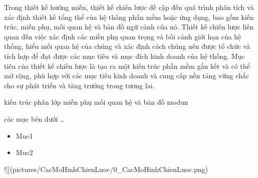 
Trong thiết kế hướng miền, thiết kế chiến lược đề cập đến quá trình phân tích và xác định thiết kế tổng thể của hệ thống phần mềm hoặc ứng dụng, bao gồm kiến trúc, miền phụ, mối quan hệ và bản đồ ngữ cảnh của nó. Thiết kế chiến lược liên quan đến việc xác định các miền phụ quan trọng và bối cảnh giới hạn của hệ thống, hiểu mối quan hệ của chúng và xác định cách chúng nên được tổ chức và tích hợp để đạt được các mục tiêu và mục đích kinh doanh của hệ thống. Mục tiêu của thiết kế chiến lược là tạo ra một kiến trúc phần mềm gắn kết và có thể mở rộng, phù hợp với các mục tiêu kinh doanh và cung cấp nền tảng vững chắc cho sự phát triển và tăng trưởng trong tương lai.

%
kiến trúc phân lớp
miền phụ
mối quan hệ và bản đồ
modun

các mục bên dưới \dots

\begin{itemize}
\item Muc1
\item Muc2
\end{itemize}







![](pictures/CacMoHinhChienLuoc/0_CacMoHinhChienLuoc.png)






